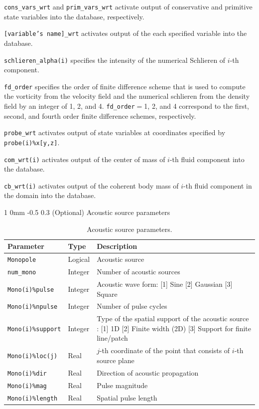 \documentclass[11pt]{article}
\makeatletter
\renewcommand{\subsubsection}{\@startsection
{subsubsection}%
{1}%
{0mm}%
{-0.5\baselineskip}%
{0.3\baselineskip}%
{\normalfont\normalsize\bfseries\color{myBrown}}}%
\newcommand\tablefont{\footnotesize}
\makeatother
\begin{document}
\texttt{cons\_vars\_wrt} and \texttt{prim\_vars\_wrt} activate output of conservative and primitive state variables into the database, respectively.

\texttt{[variable's name]\_wrt} activates output of the each specified variable into the database.

\texttt{schlieren_alpha(i)} specifies the intensity of the numerical Schlieren of $i$-th component.

\texttt{fd\_order} specifies the order of finite difference scheme that is used to compute the vorticity from the velocity field and the numerical schlieren from the density field by an integer of 1, 2, and 4. \texttt{fd\_order}$=$1, 2, and 4 correspond to the first, second, and fourth order finite difference schemes, respectively.

\texttt{probe_wrt} activates output of state variables at coordinates specified by \texttt{probe(i)\%x[y,z]}.

\texttt{com_wrt(i)} activates output of the center of mass of $i$-th fluid component into the database.

\texttt{cb_wrt(i)} activates output of the coherent body mass of $i$-th fluid component in the domain into the database.

\subsubsection{(Optional) Acoustic source parameters}
\begin{table}[H]
{\tablefont
\begin{tabularx}{6.5in}{ | R{1.5in} C{1in} Q{3.5in} | }
\hline
\textbf{Parameter} & \textbf{Type} & \textbf{Description} \\ \hline
    \texttt{Monopole} 		& 	Logical	& Acoustic source \\
    \texttt{num\_mono} 	& 	Integer	& Number of acoustic sources	 \\ \hline
    \texttt{Mono(i)\%pulse} 	& 	Integer	& Acoustic wave form: [1] Sine [2] Gaussian [3] Square	 \\
    \texttt{Mono(i)\%npulse} & 	Integer	& Number of pulse cycles	 \\
    \texttt{Mono(i)\%support} & 	Integer	& Type of the spatial support of the acoustic source : [1] 1D [2] Finite width (2D) [3] Support for finite line/patch	 \\
    \texttt{Mono(i)\%loc(j)} 	& 	Real		& $j$-th coordinate of the point that consists of $i$-th source plane \\
    \texttt{Mono(i)\%dir} 	& 	Real		& Direction of acoustic propagation	 \\
    \texttt{Mono(i)\%mag} 	& 	Real		& Pulse magnitude	 \\
    \texttt{Mono(i)\%length}	& 	Real		& Spatial pulse length \\ \hline
\end{tabularx}}
\caption{Acoustic source parameters.}
\label{t:as}
\end{table}
\end{document}
